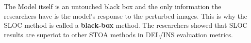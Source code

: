 \documentclass[10pt,a4paper]{article}
\begin{document}
The Model itself is an untouched black box and the only information the researchers have is the model's response to the perturbed images. This is why the SLOC method is called a \textbf{black-box} method.
The researchers showed that SLOC results are superiot to other STOA methods in DEL/INS evaluation metrics.
\end{document}
